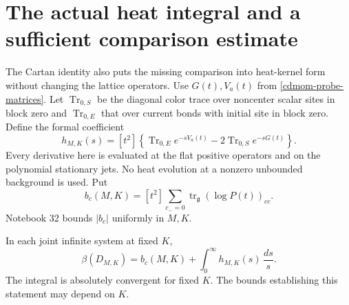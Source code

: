 \section{The actual heat integral and a sufficient comparison estimate}
\label{ahc-section}

The Cartan identity also puts the missing comparison into
heat-kernel form without changing the lattice operators.
Use \(G(t),V_a(t)\) from \eqref{cdmom-probe-matrices}.
Let \(\operatorname{Tr}_{0,S}\) be the diagonal color trace
over noncenter scalar sites in block zero and
\(\operatorname{Tr}_{0,E}\) that over current bonds with
initial site in block zero. Define the formal coefficient
\begin{equation}
 h_{M,K}(s)=[t^2]\left\{
   \operatorname{Tr}_{0,E}e^{-sV_a(t)}
                  -2\operatorname{Tr}_{0,S}e^{-sG(t)}
                         \right\}.
 \label{ahc-h-definition}
\end{equation}
Every derivative here is evaluated at the flat positive
operators and on the polynomial stationary jets. No
heat evolution at a nonzero unbounded background is
used. Put
\[
 b_c(M,K)=[t^2]\sum_{c_-=0}
           \operatorname{tr}_{\mathfrak g}(\log P(t))_{cc}.
\]
Notebook 32 bounds \(|b_c|\) uniformly in \(M,K\).

\begin{proposition}
\label{ahc-identity}
In each joint infinite system at fixed \(K\),
\begin{equation}
 \beta(D_{M,K})=b_c(M,K)
                   +\int_0^\infty h_{M,K}(s)\,\frac{ds}{s}.
 \label{ahc-exact}
\end{equation}
The integral is absolutely convergent for fixed \(K\).
The bounds establishing this statement may depend on \(K\).
\end{proposition}

